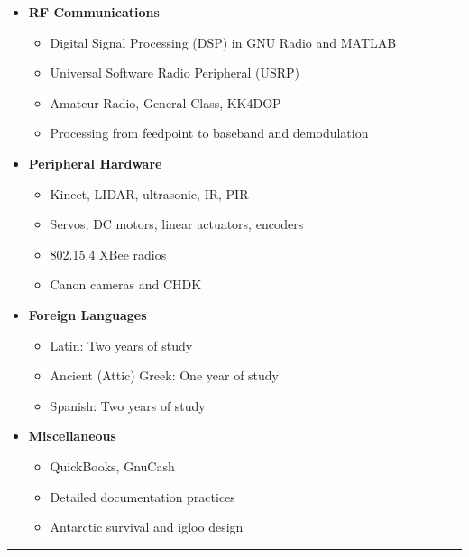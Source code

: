 \documentclass[10pt,letterpaper]{article}
\begin{document}
\begin{itemize}
\begin{itemize}
        \end{itemize}
    \item \textbf{RF Communications}
        \begin{itemize}
            \item Digital Signal Processing (DSP) in GNU Radio and MATLAB
            \item Universal Software Radio Peripheral (USRP)
            \item Amateur Radio, General Class, KK4DOP
            \item Processing from feedpoint to baseband and demodulation
        \end{itemize}
    \item \textbf{Peripheral Hardware}
        \begin{itemize}
            \item Kinect, LIDAR, ultrasonic, IR, PIR
            \item Servos, DC motors, linear actuators, encoders
            \item 802.15.4 XBee radios
            \item Canon cameras and CHDK
        \end{itemize}
    \item \textbf{Foreign Languages}
        \begin{itemize}
            \item Latin: Two years of study
            \item Ancient (Attic) Greek: One year of study
            \item Spanish: Two years of study
        \end{itemize}
    \item \textbf{Miscellaneous}
        \begin{itemize}
            \item QuickBooks, GnuCash
            \item Detailed documentation practices
            \item Antarctic survival and igloo design
        \end{itemize}
\end{itemize}

\hrule
\vspace{-0.4em}
\end{document}
